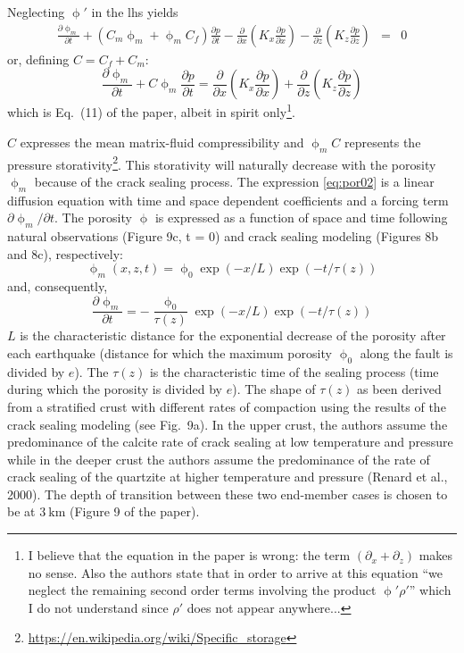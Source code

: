 Neglecting $\upphi'$ in the lhs yields
\begin{eqnarray}
\frac{\partial \upphi_m}{\partial t} 
+ (C_m \upphi_m 
+ \upphi_m C_f )\frac{\partial p}{\partial t} 
- \frac{\partial}{\partial x} \left( K_x \frac{\partial p}{\partial x} \right) 
- \frac{\partial}{\partial z} \left( K_z \frac{\partial p}{\partial z} \right) 
&=& 0 
\end{eqnarray}
or, defining $C=C_f+C_m$:
\begin{equation}
\boxed{
\frac{\partial \upphi_m}{\partial t} 
+ C \upphi_m \frac{\partial p}{\partial t} 
=\frac{\partial}{\partial x} \left( K_x \frac{\partial p}{\partial x} \right) 
+ \frac{\partial}{\partial z} \left( K_z \frac{\partial p}{\partial z} \right)
}
\label{eq:por02}
\end{equation}
which is Eq.~(11) of the paper, albeit in spirit only\footnote{I believe that the equation in the 
paper is wrong: the term $(\partial_x+\partial_z)$ makes no sense.
Also the authors state that in order to arrive at this equation 
``we neglect the remaining second
order terms involving the product $\upphi'\rho'$''
which I do not understand since $\rho'$ does not appear anywhere...}.

$C$ expresses the mean matrix-fluid compressibility and $\upphi_m C$ represents the 
pressure storativity\footnote{\url{https://en.wikipedia.org/wiki/Specific_storage}}. 
This storativity will naturally decrease with
the porosity $\upphi_m$ because of the crack sealing process.
The expression \eqref{eq:por02} is a linear diffusion equation
with time and space dependent coefficients and a forcing
term $\partial \upphi_m/\partial t$. The porosity $\upphi$ is expressed as a function of
space and time following natural observations (Figure 9c,
t = 0) and crack sealing modeling (Figures 8b and 8c),
respectively:
\begin{equation}
\upphi_m(x,z,t)=\upphi_0 \exp (-x/L) \exp (-t/\tau(z))
\label{eq:por03}
\end{equation}
and, consequently,
\begin{equation}
\frac{\partial \upphi_m}{\partial t} = -\frac{\upphi_0}{\tau(z)} \exp (-x/L) \exp (-t/\tau(z)) 
\label{eq:por04}
\end{equation}
$L$ is the characteristic distance for the exponential decrease
of the porosity after each earthquake (distance for which the
maximum porosity $\upphi_0$ along the fault is divided by $e$).
The $\tau(z)$ is the characteristic time of the sealing process
(time during which the porosity is divided by $e$). The
shape of $\tau(z)$ as been derived from a stratified crust with
different rates of compaction using the results of the crack
sealing modeling (see Fig.~9a). In the upper crust, the authors
assume the predominance of the calcite rate of crack sealing
at low temperature and pressure while in the deeper crust the authors
assume the predominance of the rate of crack sealing of the
quartzite at higher temperature and pressure (Renard et al., 2000). 
The depth of transition between these two end-member cases 
is chosen to be at $3~\si{\km}$ (Figure 9 of the paper).


